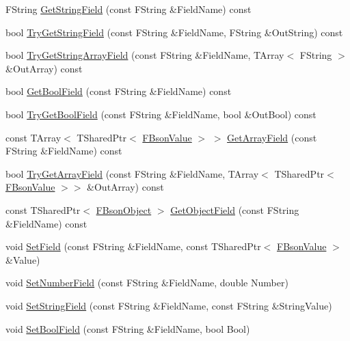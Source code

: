 \begin{DoxyCompactItemize}
\item 
F\+String \mbox{\hyperlink{class_f_bson_object_a2fabcf26e54c75aa16dc75e0ce9fc37c}{Get\+String\+Field}} (const F\+String \&Field\+Name) const
\item 
bool \mbox{\hyperlink{class_f_bson_object_a3424002e68cf2e9928c038e3d7a4aec9}{Try\+Get\+String\+Field}} (const F\+String \&Field\+Name, F\+String \&Out\+String) const
\item 
bool \mbox{\hyperlink{class_f_bson_object_aeca0635a47dd5b5add74b80672c73516}{Try\+Get\+String\+Array\+Field}} (const F\+String \&Field\+Name, T\+Array$<$ F\+String $>$ \&Out\+Array) const
\item 
bool \mbox{\hyperlink{class_f_bson_object_a112736dc2fa79b11a1bd4f7c7bcb51ad}{Get\+Bool\+Field}} (const F\+String \&Field\+Name) const
\item 
bool \mbox{\hyperlink{class_f_bson_object_ae5bc67e3ece644f8de1c2c9921d14aad}{Try\+Get\+Bool\+Field}} (const F\+String \&Field\+Name, bool \&Out\+Bool) const
\item 
const T\+Array$<$ T\+Shared\+Ptr$<$ \mbox{\hyperlink{class_f_bson_value}{F\+Bson\+Value}} $>$ $>$ \mbox{\hyperlink{class_f_bson_object_afd1ef9fcbdfd1700f50117308c80294f}{Get\+Array\+Field}} (const F\+String \&Field\+Name) const
\item 
bool \mbox{\hyperlink{class_f_bson_object_ad7c32dcbaf34aef08880ff2bf033f1bb}{Try\+Get\+Array\+Field}} (const F\+String \&Field\+Name, T\+Array$<$ T\+Shared\+Ptr$<$ \mbox{\hyperlink{class_f_bson_value}{F\+Bson\+Value}} $>$$>$ \&Out\+Array) const
\item 
const T\+Shared\+Ptr$<$ \mbox{\hyperlink{class_f_bson_object}{F\+Bson\+Object}} $>$ \mbox{\hyperlink{class_f_bson_object_aa803b297d9bdacfca1b7569c3f53d1f4}{Get\+Object\+Field}} (const F\+String \&Field\+Name) const
\item 
void \mbox{\hyperlink{class_f_bson_object_a24d085f2040b805e4f1c5ad250646a5b}{Set\+Field}} (const F\+String \&Field\+Name, const T\+Shared\+Ptr$<$ \mbox{\hyperlink{class_f_bson_value}{F\+Bson\+Value}} $>$ \&Value)
\item 
void \mbox{\hyperlink{class_f_bson_object_a0d1749707ef977f52c44eb9db029766f}{Set\+Number\+Field}} (const F\+String \&Field\+Name, double Number)
\item 
void \mbox{\hyperlink{class_f_bson_object_a97b99487e75dc6f366c95e841d006a3d}{Set\+String\+Field}} (const F\+String \&Field\+Name, const F\+String \&String\+Value)
\item 
void \mbox{\hyperlink{class_f_bson_object_a68e5a109c8efba903375686cbffbcd7f}{Set\+Bool\+Field}} (const F\+String \&Field\+Name, bool Bool)
$$
\end{DoxyCompactItemize}
